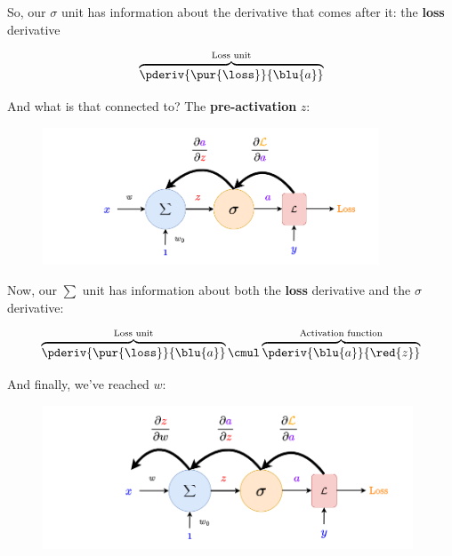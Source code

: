         So, our $\sigma$ unit has information about the derivative that comes after it: the \textbf{loss} derivative
        
        \begin{equation}
            \overbrace{
                \pderiv {\pur{\loss}} {\blu{a}} 
            }^{\text{Loss unit}} 
        \end{equation}
        
        And what is that connected to? The \textbf{pre-activation} $z$:
        
        \begin{figure}[H]
            \centering
            \includegraphics[width=100mm,scale=0.4]{images/nn_1_5_images/llc_backprop_2.png}
        \end{figure}
        
        Now, our $\sum$ unit has information about both the \textbf{loss} derivative and the $\sigma$ derivative:
        
        \begin{equation}
            \overbrace{
                \pderiv {\pur{\loss}} {\blu{a}} 
            }^{\text{Loss unit}}
            \cmul
            \overbrace{
                \pderiv {\blu{a}}     {\red{z}}
            }^{\text{Activation function}}
        \end{equation}
       
        
        And finally, we've reached $w$:
        
        \begin{figure}[H]
            \centering
            \includegraphics[width=110mm,scale=0.4]{images/nn_1_5_images/llc_backprop_3.png}
        \end{figure}
        
